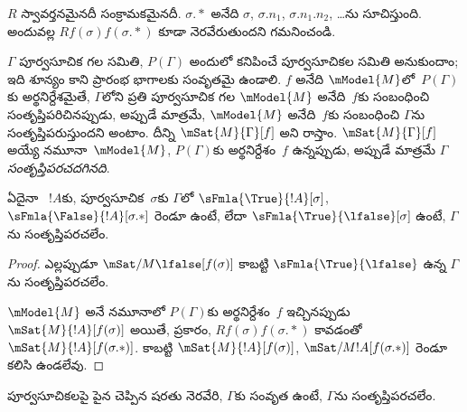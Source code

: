 \documentclass[../../../include/open-logic-section]{subfiles}
\begin{document}
$R$ స్వావర్తనమైనదీ సంక్రామకమైనదీ. $\sigma.{*}$
అనేది $\sigma$, $\sigma.n_1$,
$\sigma.n_1.n_2$, \dots ను సూచిస్తుంది.
అందువల్ల $Rf(\sigma)f(\sigma.{*})$ కూడా
నెరవేరుతుందని గమనించండి.

\begin{defn}
  $\Gamma$ పూర్వసూచిక గల
   సమితి,
  $P(\Gamma)$ అందులో కనిపించే
  పూర్వసూచికల సమితి అనుకుందాం; ఇది శూన్యం
  కాని ప్రారంభ భాగాలకు సంవృతమై ఉండాలి.
  $f$ అనేది $\mModel{M}$లో~$P(\Gamma)$కు
  అర్థనిర్దేశమైతే, $\Gamma$లోని ప్రతి
  పూర్వసూచిక గల 
  $\mModel{M}$ అనేది~$f$కు సంబంధించి
  సంతృప్తిపరిచినప్పుడు, అప్పుడే మాత్రమే, $\mModel{M}$ అనేది~$f$కు
  సంబంధించి $\Gamma$ను సంతృప్తిపరుస్తుందని అంటాం.
  దీన్ని $\mSat{M}{\Gamma}[f]$ అని రాస్తాం.
  $\mSat{M}{\Gamma}[f]$ అయ్యే నమూనా~$\mModel{M}$,
  $P(\Gamma)$కు అర్థనిర్దేశం~$f$ ఉన్నప్పుడు,
  అప్పుడే మాత్రమే $\Gamma$ \emph{సంతృప్తిపరచదగినది}.
\end{defn}

\begin{prop}
  ఏదైనా ~$!A$కు,
  పూర్వసూచిక~$\sigma$కు
  $\Gamma$లో $\sFmla{\True}{!A}[\sigma]$,
  $\sFmla{\False}{!A}[\sigma.{*}]$
  రెండూ ఉంటే, లేదా
  $\sFmla{\True}{\lfalse}[\sigma]$
  ఉంటే, $\Gamma$ను సంతృప్తిపరచలేం.
\end{prop}

\begin{proof}
  ఎల్లప్పుడూ $\mSat/{M}{\lfalse}[f(\sigma)]$
  కాబట్టి $\sFmla{\True}{\lfalse}$
  ఉన్న $\Gamma$ను సంతృప్తిపరచలేం.

  $\mModel{M}$ అనే నమూనాలో $P(\Gamma)$కు
  అర్థనిర్దేశం~$f$ ఇచ్చినప్పుడు
  $\mSat{M}{!A}[f(\sigma)]$ అయితే,
  ప్రకారం, $Rf(\sigma)f(\sigma.{*})$
  కావడంతో
  $\mSat{M}{!A}[f(\sigma.{*})]$.
  కాబట్టి $\mSat{M}{!A}[f(\sigma)]$,
  $\mSat/{M}{!A}[f(\sigma.{*})]$
  రెండూ కలిసి ఉండలేవు.
\end{proof}

\begin{thm}[నిర్దుష్టత]
  పూర్వసూచికలపై పైన చెప్పిన షరతు నెరవేరి,
  $\Gamma$కు సంవృత 
  ఉంటే, $\Gamma$ను సంతృప్తిపరచలేం.
\end{thm}
\end{document}

